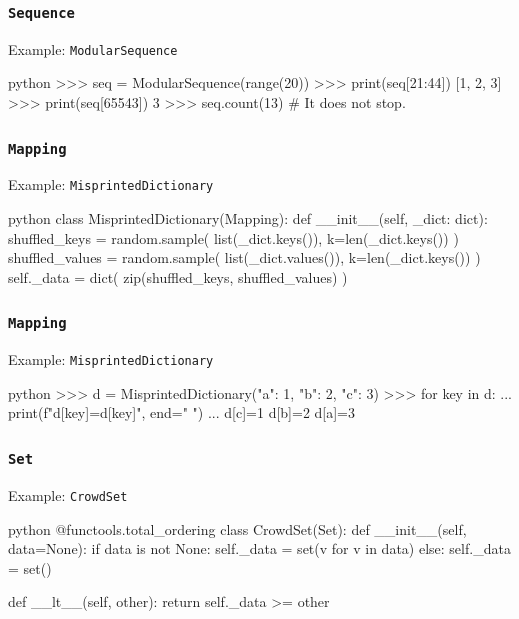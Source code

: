 \documentclass[aspectratio=169,dvipdfmx,12pt,notheorems]{beamer}
\theoremstyle{definition}
\begin{document}
\begin{frame}[fragile]\frametitle{\texttt{Sequence}}

\begin{exampleblock}{Example: \texttt{ModularSequence}}
\begin{pygments}{python}
>>> seq = ModularSequence(range(20))
>>> print(seq[21:44])
[1, 2, 3]
>>> print(seq[65543])
3
>>> seq.count(13) # It does not stop.
\end{pygments}
\end{exampleblock}

\end{frame}

\begin{frame}[fragile]\frametitle{\texttt{Mapping}}

\begin{exampleblock}{Example: \texttt{MisprintedDictionary}}
\begin{pygments}{python}
class MisprintedDictionary(Mapping):
    def __init__(self, _dict: dict):
        shuffled_keys = random.sample(
            list(_dict.keys()), k=len(_dict.keys())
        )
        shuffled_values = random.sample(
            list(_dict.values()), k=len(_dict.keys())
        )
        self._data = dict(
            zip(shuffled_keys, shuffled_values)
        )
\end{pygments}
\end{exampleblock}

\end{frame}

\begin{frame}[fragile]\frametitle{\texttt{Mapping}}

\begin{exampleblock}{Example: \texttt{MisprintedDictionary}}
\begin{pygments}{python}
>>> d = MisprintedDictionary({"a": 1, "b": 2, "c": 3})
>>> for key in d:
...     print(f"d[{key}]={d[key]}", end=" ")
...
d[c]=1 d[b]=2 d[a]=3
\end{pygments}
\end{exampleblock}

\end{frame}

\begin{frame}[fragile]\frametitle{\texttt{Set}}

\begin{exampleblock}{Example: \texttt{CrowdSet}}
\begin{pygments}{python}
@functools.total_ordering
class CrowdSet(Set):
    def __init__(self, data=None):
        if data is not None:
            self._data = set(v for v in data)
        else:
            self._data = set()

    def __lt__(self, other):
        return self._data >= other
\end{pygments}
\end{exampleblock}

\end{frame}
\end{document}

